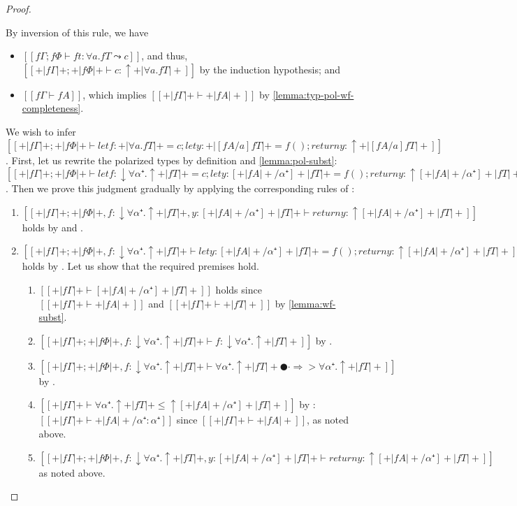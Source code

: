 \begin{proof}
\begin{caseof}
    \item {}
      By inversion of this rule, we have
      \begin{itemize}
        \item $[[fΓ ; fΦ ⊢ ft : ∀a.fT  ⤳  c]]$, and thus, 
          $[[+|fΓ|+ ; +|fΦ|+ ⊢ c : ↑+|∀a.fT|+]]$ by the induction hypothesis; and
        \item $[[fΓ ⊢ fA]]$, which implies $[[+|fΓ|+ ⊢ +|fA|+]]$ by \cref{lemma:typ-pol-wf-completeness}.
      \end{itemize}
      We wish to infer
      $[[+|fΓ|+ ; +|fΦ|+ ⊢ let f : +|∀a.fT|+ = c; let y : +|[fA/a]fT|+ = f(); return y : ↑+|[fA/a]fT|+]]$.
      First, let us rewrite the polarized types by definition and \cref{lemma:pol-subst}:
      $[[+|fΓ|+ ; +|fΦ|+ ⊢ let f : ↓∀α⁺.↑+|fT|+ = c; let y : [+|fA|+/α⁺]+|fT|+ = f(); return y : ↑[+|fA|+/α⁺]+|fT|+]]$.
      Then we prove this judgment gradually by applying the corresponding rules of \fexists:
      \begin{enumerate}
        \item $[[+|fΓ|+ ; +|fΦ|+, f : ↓∀α⁺.↑+|fT|+, y : [+|fA|+/α⁺]+|fT|+ ⊢ return y : ↑[+|fA|+/α⁺]+|fT|+]]$
          holds by  and .
        \item $[[+|fΓ|+ ; +|fΦ|+, f : ↓∀α⁺.↑+|fT|+  ⊢ let y : [+|fA|+/α⁺]+|fT|+ = f(); return y : ↑[+|fA|+/α⁺]+|fT|+]]$
          holds by . Let us show that the 
          required premises hold. 
          \begin{enumerate}
            \item $[[+|fΓ|+ ⊢ [+|fA|+/α⁺]+|fT|+]]$ holds since $[[+|fΓ|+ ⊢ +|fA|+]]$ and $[[+|fΓ|+ ⊢ +|fT|+]]$ by \cref{lemma:wf-subst}.
            \item $[[+|fΓ|+ ; +|fΦ|+, f : ↓∀α⁺.↑+|fT|+  ⊢ f : ↓∀α⁺.↑+|fT|+]]$ by .
            \item $[[+|fΓ|+ ; +|fΦ|+, f : ↓∀α⁺.↑+|fT|+  ⊢ ∀α⁺.↑+|fT|+ ● · ⇒> ∀α⁺.↑+|fT|+]]$ by .
            \item $[[+|fΓ|+  ⊢ ∀α⁺.↑+|fT|+ ≤ ↑[+|fA|+/α⁺]+|fT|+ ]]$ by :
              $[[+|fΓ|+  ⊢ +|fA|+/α⁺ : {α⁺}]]$ since $[[+|fΓ|+  ⊢ +|fA|+]]$, as noted above.
            \item $[[+|fΓ|+ ; +|fΦ|+, f : ↓∀α⁺.↑+|fT|+, y : [+|fA|+/α⁺]+|fT|+ ⊢ return y : ↑[+|fA|+/α⁺]+|fT|+]]$ as noted above.
          \end{enumerate}

\end{enumerate}
\end{caseof}
\end{proof}
